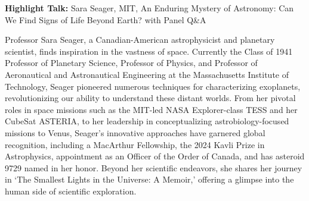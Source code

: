 \documentclass[a4paper,parskip,10pt]{scrartcl}
\begin{document}
    \begin{tcolorbox}[
        enhanced,
        title={Public Outreach Event: Next destinations for Interstellar Travel},
        sharp corners,
        colbacktitle=thistrack,
        fonttitle=\large\mediumfont,
        boxsep=0pt,
        boxrule=0pt,
        left*=0pt,
        lefttitle=4mm,
        toptitle=4mm,
        bottomtitle=4mm,
        top=0pt,
        bottom=0pt,
        sidebyside,
        sidebyside align=center,
        lefthand width=6cm,
        segmentation empty,
    ]%
        
        \tcblower

        \setlength{\parskip}{1ex}
        
        \vspace{1ex}
        \textbf{Highlight Talk:} Sara Seager, MIT, An Enduring Mystery of Astronomy: Can We Find Signs of Life Beyond Earth? with Panel Q\&A

        {
            \small
            \color{white!20!black}
            Professor Sara Seager, a Canadian-American astrophysicist and planetary scientist, finds inspiration in the vastness of space. Currently the Class of 1941 Professor of Planetary Science,  Professor of Physics, and Professor of Aeronautical and Astronautical Engineering at the Massachusetts Institute of Technology, Seager pioneered numerous techniques for characterizing exoplanets, revolutionizing our ability to understand these distant worlds. From her pivotal roles in space missions such as the MIT-led NASA Explorer-class TESS and her CubeSat ASTERIA, to her leadership in conceptualizing astrobiology-focused missions to Venus, Seager’s innovative approaches have garnered global recognition, including a MacArthur Fellowship, the 2024 Kavli Prize in Astrophysics, appointment as an Officer of the Order of Canada, and has asteroid 9729 named in her honor. Beyond her scientific endeavors, she shares her journey in ‘The Smallest Lights in the Universe: A Memoir,’ offering a glimpse into the human side of scientific exploration.}

        \vspace{2ex}
    \end{tcolorbox}
\end{document}
